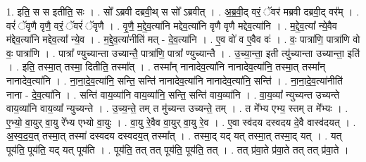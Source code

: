 \documentclass[17pt]{extarticle}
\begin{document}
1. इति॒ स स इतीति॒ सः । . सो᳚ ऽब्रवी दब्रवी॒थ् स सो᳚ ऽब्रवीत् । . अ॒ब्र॒वी॒द् वरं॒ ॅवर॑ मब्रवी दब्रवी॒द् वर᳚म् । . वरं॑ ॅवृणै वृणै॒ वरं॒ ॅवरं॑ ॅवृणै । . वृ॒णै॒ म॒द्दे॒व॒त्या॑नि मद्देव॒त्या॑नि वृणै वृणै मद्देव॒त्या॑नि । . म॒द्दे॒व॒त्या᳚ न्ये॒वैव म॑द्देव॒त्या॑नि मद्देव॒त्या᳚ न्ये॒व । . म॒द्दे॒व॒त्या॑नीति॑ मत् - दे॒व॒त्या॑नि । . ए॒व वो॑ व ए॒वैव वः॑ । . वः॒ पात्रा॑णि॒ पात्रा॑णि वो वः॒ पात्रा॑णि । . पात्रा᳚ ण्युच्यान्ता उच्यान्तै॒ पात्रा॑णि॒ पात्रा᳚ ण्युच्यान्तै । . उ॒च्या॒न्ता॒ इती त्यु॑च्यान्ता उच्यान्ता॒ इति॑ । . इति॒ तस्मा॒त् तस्मा॒ दितीति॒ तस्मा᳚त् । . तस्मा᳚न् नानादेव॒त्या॑नि नानादेव॒त्या॑नि॒ तस्मा॒त् तस्मा᳚न् नानादेव॒त्या॑नि । . ना॒ना॒दे॒व॒त्या॑नि॒ सन्ति॒ सन्ति॑ नानादेव॒त्या॑नि नानादेव॒त्या॑नि॒ सन्ति॑ । . ना॒ना॒दे॒व॒त्या॑नीति॑ नाना - दे॒व॒त्या॑नि । . सन्ति॑ वाय॒व्या॑नि वाय॒व्या॑नि॒ सन्ति॒ सन्ति॑ वाय॒व्या॑नि । . वा॒य॒व्या᳚ न्युच्यन्त उच्यन्ते वाय॒व्या॑नि वाय॒व्या᳚ न्युच्यन्ते । . उ॒च्य॒न्ते॒ तम् त मु॑च्यन्त उच्यन्ते॒ तम् । . त मे᳚भ्य एभ्य॒ स्तम् त मे᳚भ्यः । . ए॒भ्यो॒ वा॒युर् वा॒यु रे᳚भ्य एभ्यो वा॒युः । . वा॒यु रे॒वैव वा॒युर् वा॒यु रे॒व । . ए॒वा स्व॑दय दस्वदय दे॒वै वास्व॑दयत् । . अ॒स्व॒द॒य॒त् तस्मा॒त् तस्मा॑ दस्वदय दस्वदय॒त् तस्मा᳚त् । . तस्मा॒द् यद् यत् तस्मा॒त् तस्मा॒द् यत् । . यत् पूय॑ति॒ पूय॑ति॒ यद् यत् पूय॑ति । . पूय॑ति॒ तत् तत् पूय॑ति॒ पूय॑ति॒ तत् । . तत् प्र॑वा॒ते प्र॑वा॒ते तत् तत् प्र॑वा॒ते । \newline
\end{document}
